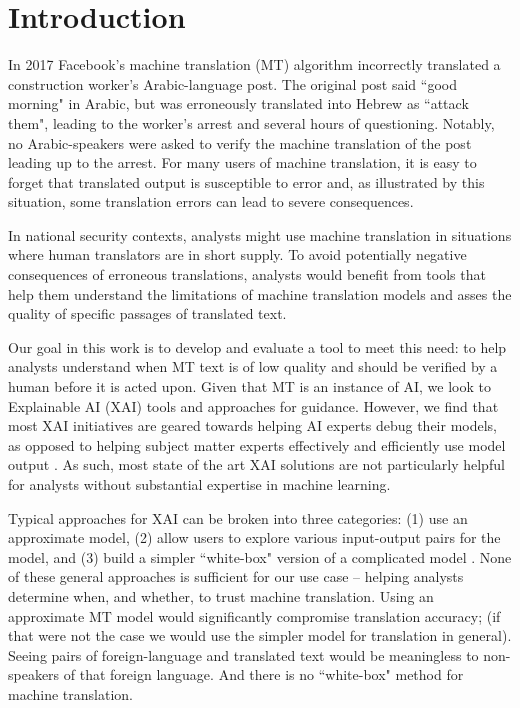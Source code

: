 \section{Introduction}

In 2017 Facebook's machine translation (MT) algorithm incorrectly translated a construction worker's Arabic-language post. The original post said ``good morning" in Arabic, but was erroneously translated into Hebrew as ``attack them", leading to the worker's arrest and several hours of questioning. Notably, no Arabic-speakers were asked to verify the machine translation of the post leading up to the arrest\cite{hernFacebook2017}. For many users of machine translation, it is easy to forget that translated output is susceptible to error and, as illustrated by this situation, some translation errors can lead to severe consequences. 

In national security contexts, analysts might use machine translation in situations where human translators are in short supply. To avoid potentially negative consequences of erroneous translations, analysts would benefit from tools that help them understand the limitations of machine translation models and asses the quality of specific passages of translated text.  

Our goal in this work is to develop and evaluate a tool to meet this need: to help analysts understand when MT text is of low quality and should be verified by a human before it is acted upon. Given that MT is an instance of AI, we look to Explainable AI (XAI) tools and approaches for guidance. However, we find that most XAI initiatives are geared towards helping AI experts debug their models, as opposed to helping subject matter experts effectively and efficiently use model output \cite{brennen2020What}. As such, most state of the art XAI solutions are not particularly helpful for analysts without substantial expertise in machine learning.  

Typical approaches for XAI can be broken into three categories: (1) use an approximate model, (2) allow users to explore various input-output pairs for the model, and (3) build a simpler ``white-box" version of a complicated model \cite{RiberoLIME2016, SelbstBarocasIntuitive2018, MittelstadtRussellExplain2019}. None of these general approaches is sufficient for our use case -- helping analysts determine when, and whether, to trust machine translation. Using an approximate MT model would significantly compromise translation accuracy; (if that were not the case we would use the simpler model for translation in general). Seeing pairs of foreign-language and translated text would be meaningless to non-speakers of that foreign language. And there is no ``white-box" method for machine translation.      

